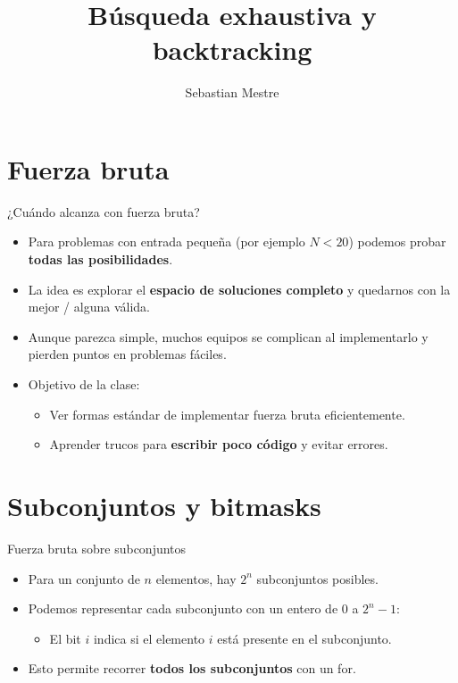 \documentclass[aspectratio=169]{beamer}
\title{Búsqueda exhaustiva y backtracking}
\author{Sebastian Mestre}
\date{}
\begin{document}
\begin{frame}
  \titlepage
\end{frame}

\section{Fuerza bruta}

\begin{frame}{¿Cuándo alcanza con fuerza bruta?}
  \begin{itemize}
    \item Para problemas con entrada pequeña (por ejemplo \(N < 20\)) podemos probar \textbf{todas las posibilidades}.
    \item La idea es explorar el \textbf{espacio de soluciones completo} y quedarnos con la mejor / alguna válida.
    \item Aunque parezca simple, muchos equipos se complican al implementarlo y pierden puntos en problemas fáciles.
    \item Objetivo de la clase:
      \begin{itemize}
        \item Ver formas estándar de implementar fuerza bruta eficientemente.
        \item Aprender trucos para \textbf{escribir poco código} y evitar errores.
      \end{itemize}
  \end{itemize}
\end{frame}

\section{Subconjuntos y bitmasks}

\begin{frame}{Fuerza bruta sobre subconjuntos}
  \begin{itemize}
    \item Para un conjunto de \(n\) elementos, hay \(2^n\) subconjuntos posibles.
    \item Podemos representar cada subconjunto con un entero de \(0\) a \(2^n - 1\):
      \begin{itemize}
        \item El bit \(i\) indica si el elemento \(i\) está presente en el subconjunto.
      \end{itemize}
    \item Esto permite recorrer \textbf{todos los subconjuntos} con un for.
  \end{itemize}
\end{frame}
\end{document}
